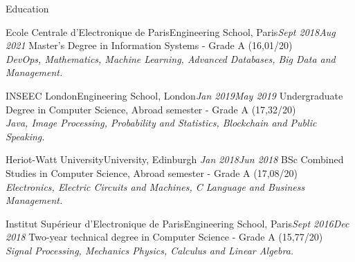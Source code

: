 \documentclass{resume}
\begin{document}
	\begin{rSection}{Education}
		\begin{school}{Ecole Centrale d'Electronique de Paris}{Engineering School, Paris}{\em Sept 2018}{\em Aug 2021}{
			Master's Degree in Information Systems - Grade A (16,01/20)  \\ 
			\textit{\small{DevOps, Mathematics, Machine Learning, Advanced Databases, Big Data and Management.}}
		}
		\end{school}

		\begin{school}{INSEEC London}{Engineering School, London}{\em Jan 2019}{\em May 2019}{
			Undergraduate Degree in Computer Science,  Abroad semester - Grade A (17,32/20)  \\
			\textit{\small{Java, Image Processing, Probability and Statistics, Blockchain and Public Speaking.}}		
		}
		\end{school}
		
		\begin{school}{Heriot-Watt University}{University, Edinburgh }{\em Jan 2018}{\em Jun 2018}{
			BSc Combined Studies in Computer Science,  Abroad semester - Grade A (17,08/20) \\
			\textit{\small{Electronics, Electric Circuits and Machines, C Language and Business Management.}}
		}	
		\end{school}

		\begin{school}{Institut Supérieur d'Electronique de Paris}{Engineering School, Paris}{\em Sept 2016}{\em Dec 2018}{
			Two-year technical degree in Computer Science - Grade A (15,77/20)\\
			\textit{\small{Signal Processing, Mechanics Physics, Calculus and Linear Algebra.}}
		}
		\end{school}
	\end{rSection}
\end{document}
